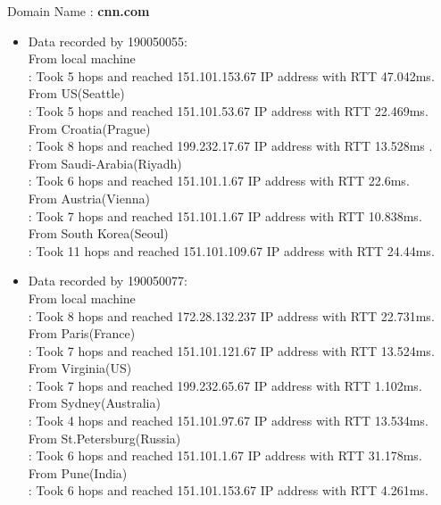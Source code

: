 \documentclass[12pt]{article}
\theoremstyle{remark}
\newcommand{\tbf}[1]{\textbf{#1}}
\begin{document}
Domain Name : \tbf{cnn.com} \\
\begin{itemize}
    \item Data recorded by 190050055:\\
From local machine       \\
: Took 5 hops and reached 151.101.153.67 IP address with RTT 47.042ms.\\
From US(Seattle)       \\
: Took 5 hops and reached 151.101.53.67 IP address with RTT 22.469ms. \\
From Croatia(Prague) \\
: Took 8 hops and reached 199.232.17.67 IP address with RTT 13.528ms . \\
From Saudi-Arabia(Riyadh)\\
: Took 6 hops and reached 151.101.1.67 IP address with RTT 22.6ms. \\
From Austria(Vienna)    \\
: Took 7 hops and reached 151.101.1.67 IP address with RTT 10.838ms. \\
From South Korea(Seoul)   \\
: Took 11 hops and reached 151.101.109.67 IP address with RTT 24.44ms.\\ 

\item Data recorded by 190050077:\\
From local machine    \\
: Took 8 hops and reached 172.28.132.237 IP address with RTT 22.731ms.\\
From Paris(France)  \\
: Took 7 hops and reached 151.101.121.67 IP address with RTT 13.524ms.\\
From Virginia(US)   \\
: Took 7 hops and reached 199.232.65.67 IP address with RTT 1.102ms.\\
From Sydney(Australia)\\
: Took 4 hops and reached 151.101.97.67  IP address with RTT 13.534ms.\\
From St.Petersburg(Russia) \\
: Took 6 hops and reached 151.101.1.67   IP address with RTT 31.178ms.\\
From Pune(India)      \\
: Took 6 hops and reached 151.101.153.67  IP address with RTT 4.261ms.\\


\end{itemize}
\end{document}
